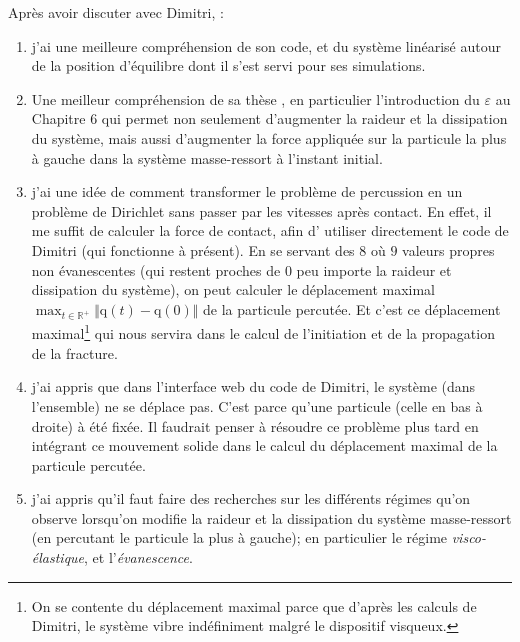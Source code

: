 \documentclass[
  french,
	11pt, %
]{fphw}
\newcommand{\bvec}[1]{\bm{\mathrm{#1}}}  %
\begin{document}
Après avoir discuter avec Dimitri, :
\begin{enumerate}
  \item j'ai une meilleure compréhension de son code, et du système linéarisé autour de la position d'équilibre dont il s'est servi pour ses simulations.
  \item Une meilleur compréhension de sa thèse \parencite{balasoiu2020halthesis}, en particulier l'introduction du $\varepsilon$ au Chapitre $6$ qui permet non seulement d'augmenter la raideur et la dissipation du système, mais aussi d'augmenter la force appliquée sur la particule la plus à gauche dans la système masse-ressort à l'instant initial.
  \item j'ai une idée de comment transformer le problème de percussion en un problème de Dirichlet sans passer par les vitesses après contact. En effet, il me suffit de calculer la force de contact, afin d' utiliser directement le code de Dimitri (qui fonctionne à présent). En se servant des $8$ où $9$ valeurs propres non évanescentes (qui restent proches de $0$ peu importe la raideur et dissipation du système), on peut calculer le déplacement maximal $\max_{t\in\mathbb{R}^{+}}{\Vert \bvec{q}(t) - \bvec{q}(0)\Vert}$ de la particule percutée. Et c'est ce déplacement maximal\footnote{On se contente du déplacement maximal parce que d'après les calculs de Dimitri, le système vibre indéfiniment malgré le dispositif visqueux.} qui nous servira dans le calcul de l'initiation et de la propagation de la fracture.
  \item j'ai appris que dans l'interface web du code de Dimitri, le système (dans l'ensemble) ne se déplace pas. C'est parce qu'une particule (celle en bas à droite) à été fixée. Il faudrait penser à résoudre ce problème plus tard en intégrant ce mouvement solide dans le calcul du déplacement maximal de la particule percutée. 
  \item j'ai appris qu'il faut faire des recherches sur les différents régimes qu'on observe lorsqu'on modifie la raideur et la dissipation du système masse-ressort (en percutant le particule la plus à gauche); en particulier le régime \emph{visco-élastique}, et l'\emph{évanescence}. 
\end{enumerate}

 
\clearpage   %
\printbibliography
\end{document}
